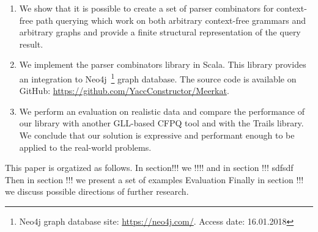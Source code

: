 \begin{enumerate}
\item We show that it is possible to create a set of parser combinators for context-free path querying which work on both arbitrary context-free grammars and arbitrary graphs and provide a finite structural representation of the query result.
\item We implement the parser combinators library in Scala. This library provides an integration to Neo4j~\footnote{Neo4j graph database site: \url{https://neo4j.com/}. Access date: 16.01.2018} graph database. The source code is available on GitHub: \url{https://github.com/YaccConstructor/Meerkat}.
\item We perform an evaluation on realistic data and compare the performance of our library with another GLL-based CFPQ tool and with the Trails library.
We conclude that our solution is expressive and performant enough to be applied to the real-world problems.
\end{enumerate}


This paper is orgatized as follows.
In section!!! we !!!! and in section !!! sdfsdf
Then in section !!! we present a set of examples
Evaluation
Finally in section !!! we discuss possible directions of further research.
